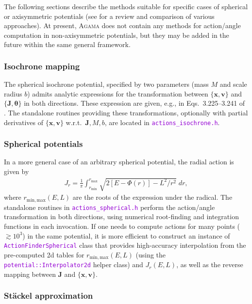 \documentclass[12pt]{article}
\newcommand{\Agama}{\textsc{Agama}\xspace}
\newcommand{\ttt}[1]{\textcolor{darkviolet}{\texttt{#1}}}
\newcommand{\bv}{\boldsymbol{v}}
\newcommand{\bx}{\boldsymbol{x}}
\newcommand{\bJ}{\boldsymbol{J}}
\newcommand{\bt}{\boldsymbol{\theta}}
\begin{document}
The following sections describe the methods suitable for specific cases of spherical or axisymmetric potentials (see \cite{SandersBinney2016} for a review and comparison of various approaches).
At present, \Agama does not contain any methods for action/angle computation in non\--axi\-sym\-met\-ric potentials, but they may be added in the future within the same general framework.

\subsubsection{Isochrone mapping}  \label{sec:ActionsIsochrone}

The spherical isochrone potential, specified by two parameters (mass $M$ and scale radius $b$) admits analytic expressions for the transformation between $\{\bx,\bv\}$ and $\{\bJ,\bt\}$ in both directions. These expression are given, e.g., in Eqs.~3.225--3.241 of \cite{BinneyTremaine}.
The standalone routines providing these transformations, optionally with partial derivatives of $\{\bx,\bv\}$ w.r.t.\ $\bJ, M, b$, are located in \ttt{actions_isochrone.h}.

\subsubsection{Spherical potentials}  \label{sec:ActionsSpherical}

In a more general case of an arbitrary spherical potential, the radial action is given by 
\begin{align*}
J_r = \frac{1}{\pi} \int_{r_\mathrm{min}}^{r_\mathrm{max}} \sqrt{2[E-\Phi(r)] - L^2/r^2}\;dr,
\end{align*}
where $r_\mathrm{min,max}(E,L)$ are the roots of the expression under the radical.
The standalone routines in \ttt{actions_spherical.h} perform the action/angle transformation in both directions, using numerical root-finding and integration functions in each invocation. If one needs to compute actions for many points ($\gtrsim 10^3$) in the same potential, it is more efficient to construct an instance of \ttt{ActionFinderSpherical} class that provides high-accuracy interpolation from the pre-computed 2d tables for $r_\mathrm{min,max}(E,L)$ (using the \ttt{potential::Interpolator2d} helper class) and $J_r(E,L)$, as well as the reverse mapping between $\bJ$ and $\{\bx,\bv\}$.

\subsubsection{St\"ackel approximation}  \label{sec:ActionsStaeckel}
\end{document}
